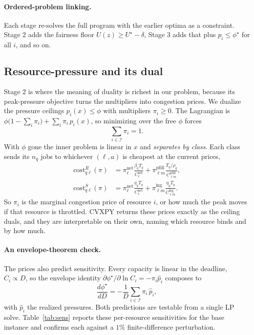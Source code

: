 \paragraph{Ordered-problem linking.} Each stage re-solves the full program with the
earlier optima as a constraint. Stage 2 adds the fairness floor $U(z)\ge U^\star-\delta$, Stage 3 adds
that plus $p_i\le\phi^\star$ for all $i$, and so on.

\subsection{Resource-pressure and its dual}
Stage 2 is where the meaning of duality is richest in our problem, because its peak-pressure objective turns
the multipliers into congestion prices. We dualize the pressure ceilings
$p_i(x)\le\phi$ with multipliers $\pi_i\ge0$. The Lagrangian is
$\phi\big(1-\sum_i\pi_i\big)+\sum_i\pi_i\,p_i(x)$, so minimizing over the free
$\phi$ forces
\[
\sum_{i\in\mathcal{I}}\pi_i=1.
\]
With $\phi$ gone the inner problem is linear in $x$
and \emph{separates by class}. Each class sends its $n_q$ jobs to whichever
$(\ell,a)$ is cheapest at the current prices,
\[
\begin{aligned}
\mathrm{cost}^R_{q\ell}(\pi)&=\pi^{\mathrm{net}}_\ell\tfrac{\beta_q T_q}{C^{\mathrm{net}}_\ell}+\pi^{\mathrm{pfill}}_{\ell m}\tfrac{T_q/\rho_q}{C^{\mathrm{pfill}}_{\ell m}},\\
\mathrm{cost}^S_{q\ell}(\pi)&=\pi^{\mathrm{net}}_\ell\tfrac{\eta_q T_q}{C^{\mathrm{net}}_\ell}+\pi^{\mathrm{ing}}_{\ell m}\tfrac{\eta_q T_q}{C^{\mathrm{ing}}_{\ell m}}.
\end{aligned}
\]
So $\pi_i$ is the marginal congestion price of resource $i$, or how much the peak
moves if that resource is throttled. CVXPY returns these prices exactly as the
ceiling duals, and they are interpretable on their own, naming which resource
binds and by how much.

\paragraph{An envelope-theorem check.} The prices also predict sensitivity. Every
capacity is linear in the deadline, $C_i\propto D$, so the envelope identity
$\partial\phi^\star/\partial\ln C_i=-\pi_i\hat p_i$ composes to
\[
\frac{d\phi^\star}{dD}=-\frac{1}{D}\sum_{i\in\mathcal{I}}\pi_i\,\hat p_i,
\]
with $\hat p_i$ the realized pressures. Both predictions are testable from a single LP solve.
Table~\ref{tab:sens} reports these per-resource sensitivities for the base instance
and confirms each against a $1\%$ finite-difference perturbation.

